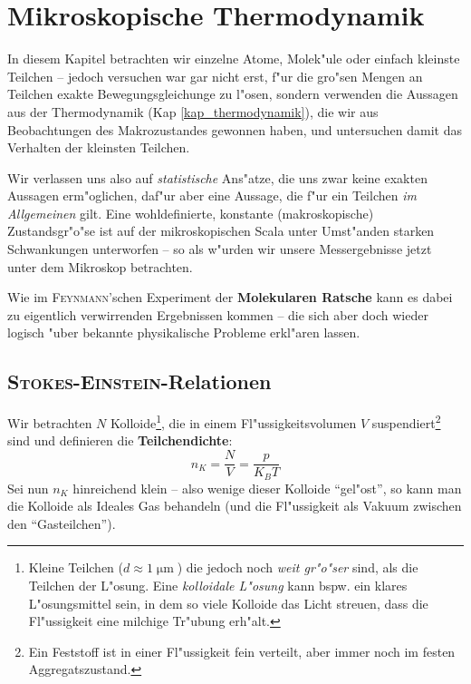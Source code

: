 \chapter{Mikroskopische Thermodynamik}
\label{kap_mikroskopische-thermodynamik}




In diesem Kapitel betrachten wir einzelne Atome, Molek"ule oder einfach
kleinste Teilchen -- jedoch versuchen war gar nicht erst, f"ur die
gro"sen Mengen an Teilchen exakte Bewegungsgleichunge zu l"osen, sondern
verwenden die Aussagen aus der Thermodynamik (Kap
\ref{kap_thermodynamik}), die wir aus Beobachtungen des Makrozustandes
gewonnen haben, und untersuchen damit das Verhalten der kleinsten
Teilchen.

Wir verlassen uns also auf \emph{statistische} Ans"atze, die uns zwar
keine exakten Aussagen erm"oglichen, daf"ur aber eine Aussage, die
f"ur ein Teilchen \emph{im Allgemeinen} gilt. Eine wohldefinierte,
konstante (makroskopische) Zustandsgr"o"se ist auf der mikroskopischen
Scala unter Umst"anden starken Schwankungen unterworfen -- so als
w"urden wir unsere Messergebnisse jetzt unter dem Mikroskop
betrachten.

Wie im \textsc{Feynmann}'schen Experiment der \textbf{Molekularen
  Ratsche} kann es dabei zu eigentlich verwirrenden Ergebnissen kommen
-- die sich aber doch wieder logisch "uber bekannte physikalische
Probleme erkl"aren lassen.






\section{\textsc{Stokes-Einstein}-Relationen}
\label{kap_stokes-einstein-relationen}

Wir betrachten $N$ Kolloide\footnote{Kleine
  Teilchen ($d \approx 1 \operatorname{\mu m}$) die jedoch noch
  \emph{weit gr"o"ser} sind, als die Teilchen der L"osung. Eine
  \emph{kolloidale L"osung} kann bspw. ein klares L"osungsmittel sein,
  in dem so viele Kolloide das Licht streuen, dass die Fl"ussigkeit
  eine milchige Tr"ubung erh"alt.}, die in einem Fl"ussigkeitsvolumen
$V$ suspendiert\footnote{Ein Feststoff ist in einer
  Fl"ussigkeit fein verteilt, aber immer noch im festen
  Aggregatszustand.} sind und definieren die \textbf{Teilchendichte}:
\begin{equation}
   \label{eqn_def_teilchendichte}
   n_K = \frac{N}{V} = \frac{p}{K_B T}
\end{equation}
Sei nun $n_K$ hinreichend klein -- also wenige dieser Kolloide
"`gel"ost"', so kann man die Kolloide als Ideales Gas behandeln (und
die Fl"ussigkeit als Vakuum zwischen den "`Gasteilchen"').


